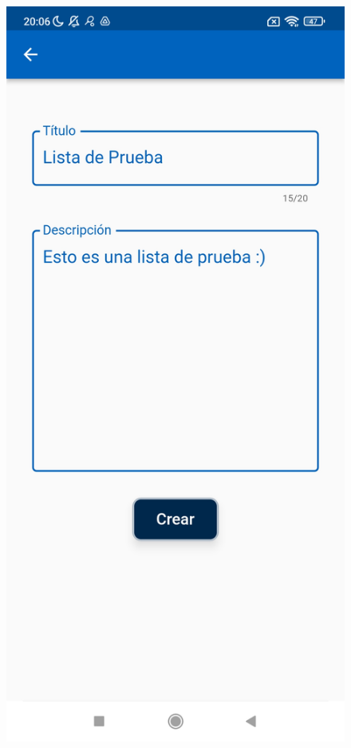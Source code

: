 \documentclass{article}
\begin{document}
\begin{figure}[h]
    \centering
    \begin{minipage}[h]{0.33\textwidth}
        \includegraphics[width=\textwidth]{imagenes/pantallas/listas/crear_lista.jpg}

\end{minipage}
\end{figure}
\end{document}
